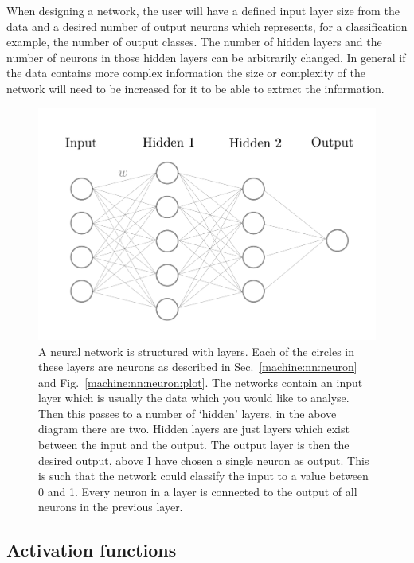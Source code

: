 When designing a network, the user will have a defined input layer size from the data and a desired number of output neurons which represents, for a classification example, the number of output classes. 
The number of hidden layers and the number of neurons in those hidden layers can be arbitrarily changed. 
In general if the data contains more complex information the size or complexity of the network will need to be increased for it to be able to extract the information. 

\begin{figure}[h]
    \centering
    \includegraphics[width=\columnwidth]{C4_cnn/simple_network.pdf}
    \caption[Example structure of a neural network.]{A neural network is structured with layers. Each of the circles in these layers are neurons as described in Sec.~\ref{machine:nn:neuron} and Fig.~\ref{machine:nn:neuron:plot}. The networks contain an input layer which is usually the data which you would like to analyse. Then this passes to a number of `hidden' layers, in the above diagram there are two. Hidden layers are just layers which exist between the input and the output. The output layer is then the desired output, above I have chosen a single neuron as output. This is such that the network could classify the input to a value between 0 and 1. Every neuron in a layer is connected to the output of all neurons in the previous layer.}
    \label{machine:nn:structure:plot}
\end{figure}


\subsection{\label{machine:nn:activation}Activation functions}

